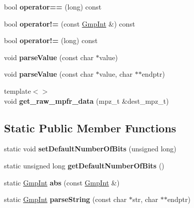 \begin{DoxyCompactItemize}
\item 
\mbox{\label{class_gmp_int_a1da3b4c309a1ff532a1e34110311e243}} 
bool {\bfseries operator==} (long) const
\item 
\mbox{\label{class_gmp_int_a780da3bcc1e73c203fb95299dda3ee6d}} 
bool {\bfseries operator!=} (const \hyperlink{class_gmp_int}{Gmp\+Int} \&) const
\item 
\mbox{\label{class_gmp_int_ad6fdbfa0ad3ec0d324b0aa6879b8d6c1}} 
bool {\bfseries operator!=} (long) const
\item 
\mbox{\label{class_gmp_int_a92a41d198711c2896d2ae7bca42209de}} 
void {\bfseries parse\+Value} (const char $\ast$value)
\item 
\mbox{\label{class_gmp_int_a79947383c9f80c0867057bbba74cc59a}} 
void {\bfseries parse\+Value} (const char $\ast$value, char $\ast$$\ast$endptr)
\item 
\mbox{\label{class_gmp_int_ad68c096721eca70fb9ed0f82513008b3}} 
{\footnotesize template$<$$>$ }\\void {\bfseries get\+\_\+raw\+\_\+mpfr\+\_\+data} (mpz\+\_\+t \&dest\+\_\+mpz\+\_\+t)
\end{DoxyCompactItemize}
\subsection*{Static Public Member Functions}
\begin{DoxyCompactItemize}
\item 
\mbox{\label{class_gmp_int_a273ae97f8f05b7f9cd01ab5eea9153fc}} 
static void {\bfseries set\+Default\+Number\+Of\+Bits} (unsigned long)
\item 
\mbox{\label{class_gmp_int_a23c5d1a57e1bd9c4415840ed84a3bc6d}} 
static unsigned long {\bfseries get\+Default\+Number\+Of\+Bits} ()
\item 
\mbox{\label{class_gmp_int_aaeb789d48d137fb5c33bf649187e8b55}} 
static \hyperlink{class_gmp_int}{Gmp\+Int} {\bfseries abs} (const \hyperlink{class_gmp_int}{Gmp\+Int} \&)
\item 
\mbox{\label{class_gmp_int_a5e0da7c2ee351f008be6508fd9011451}} 
static \hyperlink{class_gmp_int}{Gmp\+Int} {\bfseries parse\+String} (const char $\ast$str, char $\ast$$\ast$endptr)
\end{DoxyCompactItemize}
